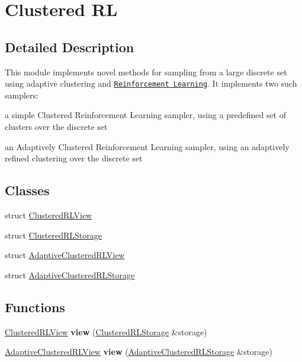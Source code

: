 \hypertarget{group___clustered_r_l_module}{}\section{Clustered RL}
\label{group___clustered_r_l_module}


\subsection{Detailed Description}
\begin{DoxyParagraph}{}
This module implements novel methods for sampling from a large discrete set using adaptive clustering and \href{https://en.wikipedia.org/wiki/Reinforcement_learning}{\tt Reinforcement Learning}. It implements two such samplers\+: 
\end{DoxyParagraph}
\begin{DoxyParagraph}{}

\begin{DoxyItemize}
\item a simple Clustered Reinforcement Learning sampler, using a predefined set of clusters over the discrete set
\item an Adaptively Clustered Reinforcement Learning sampler, using an adaptively refined clustering over the discrete set 
\end{DoxyItemize}
\end{DoxyParagraph}
\subsection*{Classes}
\begin{DoxyCompactItemize}
\item 
struct \hyperlink{struct_clustered_r_l_view}{Clustered\+R\+L\+View}
\item 
struct \hyperlink{struct_clustered_r_l_storage}{Clustered\+R\+L\+Storage}
\item 
struct \hyperlink{struct_adaptive_clustered_r_l_view}{Adaptive\+Clustered\+R\+L\+View}
\item 
struct \hyperlink{struct_adaptive_clustered_r_l_storage}{Adaptive\+Clustered\+R\+L\+Storage}
\end{DoxyCompactItemize}
\subsection*{Functions}
\begin{DoxyCompactItemize}
\item 
\mbox{\label{group___clustered_r_l_module_ga67243c84dd2e7eaee4740e3f22b346f0}} 
\hyperlink{struct_clustered_r_l_view}{Clustered\+R\+L\+View} {\bfseries view} (\hyperlink{struct_clustered_r_l_storage}{Clustered\+R\+L\+Storage} \&storage)
\item 
\mbox{\label{group___clustered_r_l_module_gae34537c92635314d98813e8a7c5f0b42}} 
\hyperlink{struct_adaptive_clustered_r_l_view}{Adaptive\+Clustered\+R\+L\+View} {\bfseries view} (\hyperlink{struct_adaptive_clustered_r_l_storage}{Adaptive\+Clustered\+R\+L\+Storage} \&storage)
\end{DoxyCompactItemize}
